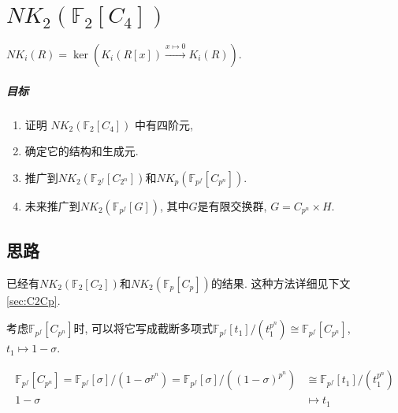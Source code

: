 \chapter{$NK_2(\mathbb{F}_2[C_4])$}

$NK_i(R)=\ker(K_i(R[x])\overset{x\mapsto 0}\longrightarrow K_i(R)). $

\paragraph{目标} %
\label{par:目标}
\begin{enumerate}
	\item 证明 $NK_2(\mathbb{F}_2[C_4])$ 中有四阶元, 
	\item 确定它的结构和生成元. 
	\item 推广到$NK_2(\mathbb{F}_{2^f}[C_{2^n}])$和$NK_p(\mathbb{F}_{p^f}[C_{p^n}])$. 
	\item 未来推广到$NK_2(\mathbb{F}_{p^f}[G])$, 其中$G$是有限交换群, $G=C_{p^n} \times H$. 
\end{enumerate}
































 
\section{思路}
已经有$NK_2(\mathbb{F}_2[C_2])$和$NK_2(\mathbb{F}_p[C_p])$的结果\cite{Guin-Waléry1981}. 这种方法详细见下文\ref{sec:C2Cp}. 

考虑$\mathbb{F}_{p^f}[C_{p^n}]$时, 可以将它{\color{blue}写成截断多项式$\mathbb{F}_{p^f}[t_1]/(t_1^{p^n})\cong \mathbb{F}_{p^f}[C_{p^n}]$}, $t_1\mapsto 1-\sigma$. 

\begin{align*}
\mathbb{F}_{p^f}[C_{p^n}]=\mathbb{F}_{p^f}[\sigma]/(1-\sigma^{p^n}) = \mathbb{F}_{p^f}[\sigma]/((1-\sigma)^{p^n}) &\cong \mathbb{F}_{p^f}[t_1]/(t_1^{p^n}) \\
 1-\sigma & \mapsto t_1
\end{align*}




